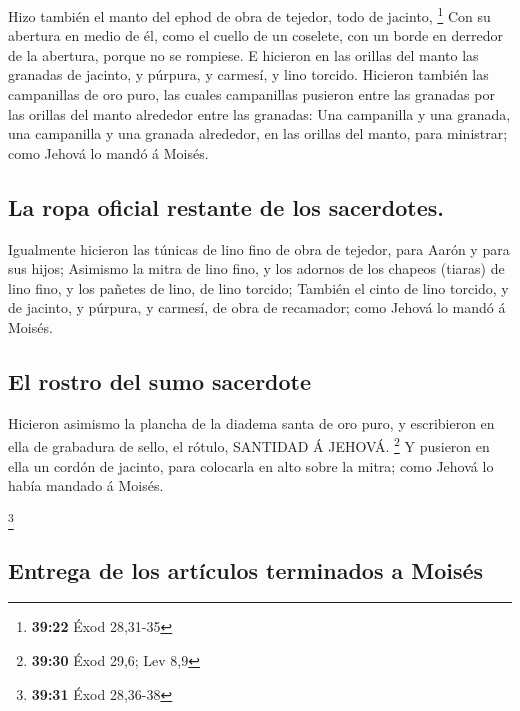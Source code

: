  Hizo también el manto del ephod de obra de tejedor, todo
de jacinto, \footnote{\textbf{39:22} Éxod 28,31-35}  Con su
abertura en medio de él, como el cuello de un coselete, con un borde en
derredor de la abertura, porque no se rompiese.  E hicieron
en las orillas del manto las granadas de jacinto, y púrpura, y carmesí,
y lino torcido.  Hicieron también las campanillas de oro
puro, las cuales campanillas pusieron entre las granadas por las orillas
del manto alrededor entre las granadas:  Una campanilla y
una granada, una campanilla y una granada alrededor, en las orillas del
manto, para ministrar; como Jehová lo mandó á Moisés.

\hypertarget{la-ropa-oficial-restante-de-los-sacerdotes.}{%
\subsection{La ropa oficial restante de los
sacerdotes.}\label{la-ropa-oficial-restante-de-los-sacerdotes.}}

 Igualmente hicieron las túnicas de lino fino de obra de
tejedor, para Aarón y para sus hijos;  Asimismo la mitra de
lino fino, y los adornos de los chapeos (tiaras) de lino fino, y los
pañetes de lino, de lino torcido;  También el cinto de lino
torcido, y de jacinto, y púrpura, y carmesí, de obra de recamador; como
Jehová lo mandó á Moisés.

\hypertarget{el-rostro-del-sumo-sacerdote}{%
\subsection{El rostro del sumo
sacerdote}\label{el-rostro-del-sumo-sacerdote}}

 Hicieron asimismo la plancha de la diadema santa de oro
puro, y escribieron en ella de grabadura de sello, el rótulo, SANTIDAD Á
JEHOVÁ. \footnote{\textbf{39:30} Éxod 29,6; Lev 8,9}  Y
pusieron en ella un cordón de jacinto, para colocarla en alto sobre la
mitra; como Jehová lo había mandado á Moisés.

\footnote{\textbf{39:31} Éxod 28,36-38}

\hypertarget{entrega-de-los-artuxedculos-terminados-a-moisuxe9s}{%
\subsection{Entrega de los artículos terminados a
Moisés}\label{entrega-de-los-artuxedculos-terminados-a-moisuxe9s}}

